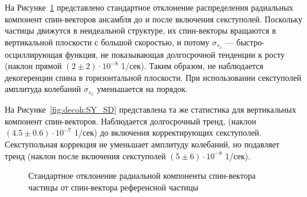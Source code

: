 На Рисунке~\ref{fig:decoh:SX_SD} представлено стандартное отклонение распределения 
радиальных компонент спин-векторов ансамбля
до и после включения секступолей. Поскольку частицы движутся в неидеальной структуре, их спин-векторы вращаются
в вертикальной плоскости с большой скоростью, и потому $\sigma_{s_x}$ --- быстро-осциллирующая функция, не
показывающая долгосрочной тенденции к росту (наклон прямой $(2\pm2)\cdot 10^{-8}$ 1/сек). Таким образом, 
не наблюдается декогеренции спина в горизонтальной плоскости. При использовании секступолей 
амплитуда колебаний $\sigma_{s_x}$ уменьшается на порядок.

На Рисунке~\ref{fig:decoh:SY_SD} представлена та же статистика  для вертикальных компонент спин-векторов. Наблюдается долгосрочный тренд, 
(наклон $(4.5 \pm 0.6)\cdot 10^{-7}$ 1/сек) до включения корректирующих секступолей. Секступольная коррекция не уменьшает амплитуду колебаний, 
но подавляет тренд (наклон после включения секступолей $(5\pm 6)\cdot 10^{-8}$ 1/сек).

\begin{figure}[h!]
	\centering
	\caption{Стандартное отклонение радиальной компоненты спин-вектора частицы от спин-вектора референсной частицы\label{fig:decoh:SX_SD}}
\end{figure}

